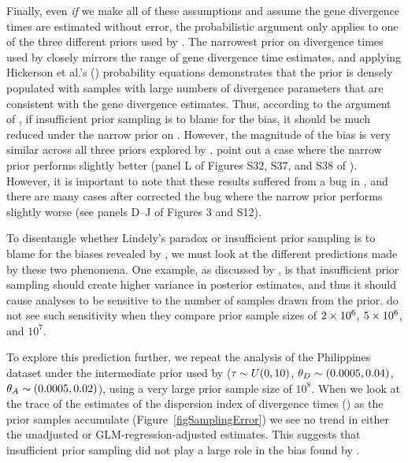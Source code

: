 \documentclass[letterpaper,12pt]{article}
\begin{document}
\begin{linenumbers}
Finally, even \emph{if} we make all of these assumptions and assume the gene
divergence times are estimated without error, the probabilistic argument only
applies to one of the three different priors used by \citet{Oaks2012}.
The narrowest prior on divergence times used by \citet{Oaks2012} closely mirrors
the range of gene divergence time estimates, and applying Hickerson et al.'s
(\citeyear{Hickerson2013}) probability equations demonstrates that the prior
is densely populated with samples with large numbers of divergence parameters
that are consistent with the gene divergence estimates.
Thus, according to the argument of \citet{Hickerson2013}, if insufficient prior
sampling is to blame for the bias, it should be much reduced under the narrow
prior on \divt{}.
However, the magnitude of the bias is very similar across all three priors
explored by \citet{Oaks2012}.
\citet{Hickerson2013} point out a case where the narrow prior performs
slightly better (panel L of Figures S32, S37, and S38 of \citet{Oaks2012}).
However, it is important to note that these results suffered from a bug
in \msb, and there are many cases after \citet{Oaks2012} corrected the 
bug where the narrow prior performs slightly worse (see panels D--J of
Figures 3 and S12).

To disentangle whether Lindely's paradox or insufficient prior sampling is
to blame for the biases revealed by \citet{Oaks2012}, we must look at
the different predictions made by these two phenomena.
One example, as discussed by \citet{Oaks2012}, is that insufficient prior
sampling should create higher variance in posterior estimates, and thus it
should cause analyses to be sensitive to the number of samples drawn from the
prior.
\citet{Oaks2012} do not see such sensitivity when they compare prior sample
sizes of $2\times 10^{6}$, $5\times 10^{6}$, and $10^7$.

To explore this prediction further, we repeat the analysis of the Philippines
dataset under the intermediate prior used by \citet{Oaks2012} ($\tau_{} \sim U(0,
10)$, $\meanDescendantTheta{} \sim (0.0005, 0.04)$, $\ancestralTheta{} \sim
(0.0005, 0.02)$), using a very large prior sample size of $10^8$.
When we look at the trace of the estimates of the dispersion index of
divergence times (\vmratio{}) as the prior samples accumulate
(Figure~\ref{figSamplingError}) we see no trend in either the unadjusted or
GLM-regression-adjusted estimates.
This suggests that insufficient prior sampling did not play a large
role in the bias found by \citet{Oaks2012}.


\end{linenumbers}
\end{document}
